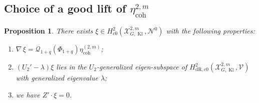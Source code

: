 \documentclass[cjm]{ipart}
\theoremstyle{plain}
\newtheorem{proposition}[theorem]{Proposition}
\theoremstyle{remark}
\DeclareMathOperator{\coh}{coh}
\DeclareMathOperator{\Kl}{Kl}
\newcommand{\cN}{\mathcal{N}}
\newcommand{\cP}{\mathcal{P}}
\newcommand{\cQ}{\mathcal{Q}}
\newcommand{\cV}{\mathcal{V}}
\newcommand{\cX}{\mathcal{X}}
\newcommand{\dR}{\mathrm{dR}}
\numberwithin{equation}{subsection}
\begin{document}
 \subsection{Choice of a good lift of $\eta_{\coh}^{2,m}$}


  \begin{proposition}\label{prop:goodxi}
 There exists $\xi\in  H^2_{c0}(\cX^{2,m}_{G,\Kl},\cN^0)$ with the following properties:
 \begin{enumerate}
  \item $\nabla\, \xi=\cQ_{1+q}(\Phi_{1+q})\eta_{\coh}^{(2,m)}$;
  \item $(U_2'-\lambda)\xi$ lies in the $U_2$-generalized eigen-subspace of $H^2_{\dR,c0}(\cX^{2,m}_{G,\Kl},\cV)$ with generalized eigenvalue $\lambda$;
  \item we have $Z'\cdot\xi=0$.
 \end{enumerate}
\end{proposition}
\end{document}
